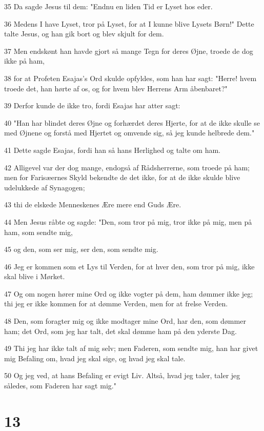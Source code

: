 \par 35 Da sagde Jesus til dem: "Endnu en liden Tid er Lyset hos eder.
\par 36 Medens I have Lyset, tror på Lyset, for at I kunne blive Lysets Børn!" Dette talte Jesus, og han gik bort og blev skjult for dem.
\par 37 Men endskønt han havde gjort så mange Tegn for deres Øjne, troede de dog ikke på ham,
\par 38 for at Profeten Esajas's Ord skulde opfyldes, som han har sagt: "Herre! hvem troede det, han hørte af os, og for hvem blev Herrens Arm åbenbaret?"
\par 39 Derfor kunde de ikke tro, fordi Esajas har atter sagt:
\par 40 "Han har blindet deres Øjne og forhærdet deres Hjerte, for at de ikke skulle se med Øjnene og forstå med Hjertet og omvende sig, så jeg kunde helbrede dem."
\par 41 Dette sagde Esajas, fordi han så hans Herlighed og talte om ham.
\par 42 Alligevel var der dog mange, endogså af Rådsherrerne, som troede på ham; men for Farisæernes Skyld bekendte de det ikke, for at de ikke skulde blive udelukkede af Synagogen;
\par 43 thi de elskede Menneskenes Ære mere end Guds Ære.
\par 44 Men Jesus råbte og sagde: "Den, som tror på mig, tror ikke på mig, men på ham, som sendte mig,
\par 45 og den, som ser mig, ser den, som sendte mig.
\par 46 Jeg er kommen som et Lys til Verden, for at hver den, som tror på mig, ikke skal blive i Mørket.
\par 47 Og om nogen hører mine Ord og ikke vogter på dem, ham dømmer ikke jeg; thi jeg er ikke kommen for at dømme Verden, men for at frelse Verden.
\par 48 Den, som foragter mig og ikke modtager mine Ord, har den, som dømmer ham; det Ord, som jeg har talt, det skal dømme ham på den yderste Dag.
\par 49 Thi jeg har ikke talt af mig selv; men Faderen, som sendte mig, han har givet mig Befaling om, hvad jeg skal sige, og hvad jeg skal tale.
\par 50 Og jeg ved, at hans Befaling er evigt Liv. Altså, hvad jeg taler, taler jeg således, som Faderen har sagt mig."

\chapter{13}

